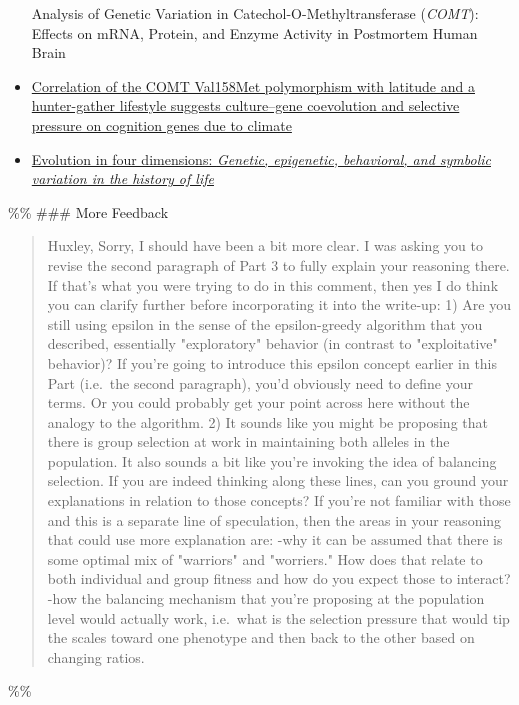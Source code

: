 \documentclass[letterpaper]{article}
\begin{document}
\begin{itemize}
{Analysis of Genetic Variation in Catechol-O-Methyltransferase
(\emph{COMT}): Effects on mRNA, Protein, and Enzyme Activity in Postmortem
Human Brain}
\item \href{https://www.jstage.jst.go.jp/article/ase/121/3/121\_130731/\_html/-char/en}{Correlation
of the COMT Val158Met polymorphism with latitude and a hunter-gather
lifestyle suggests culture--gene coevolution and selective pressure on
cognition genes due to climate}
\item \href{https://www.ncbi.nlm.nih.gov/pmc/articles/PMC1265888/}{Evolution in
four dimensions: \emph{Genetic, epigenetic, behavioral, and symbolic
variation in the history of life}}
\end{itemize}

\%\% \#\#\# More Feedback

\begin{quote}
Huxley, Sorry, I should have been a bit more clear. I was asking you
to revise the second paragraph of Part 3 to fully explain your
reasoning there. If that's what you were trying to do in this comment,
then yes I do think you can clarify further before incorporating it
into the write-up: 1) Are you still using epsilon in the sense of the
epsilon-greedy algorithm that you described, essentially "exploratory"
behavior (in contrast to "exploitative" behavior)? If you're going to
introduce this epsilon concept earlier in this Part (i.e. the second
paragraph), you'd obviously need to define your terms. Or you could
probably get your point across here without the analogy to the
algorithm. 2) It sounds like you might be proposing that there is
group selection at work in maintaining both alleles in the population.
It also sounds a bit like you're invoking the idea of balancing
selection. If you are indeed thinking along these lines, can you
ground your explanations in relation to those concepts? If you're not
familiar with those and this is a separate line of speculation, then
the areas in your reasoning that could use more explanation are: -why
it can be assumed that there is some optimal mix of "warriors" and
"worriers." How does that relate to both individual and group fitness
and how do you expect those to interact? -how the balancing mechanism
that you're proposing at the population level would actually work,
i.e. what is the selection pressure that would tip the scales toward
one phenotype and then back to the other based on changing ratios.
\end{quote}

\%\%
\end{document}

